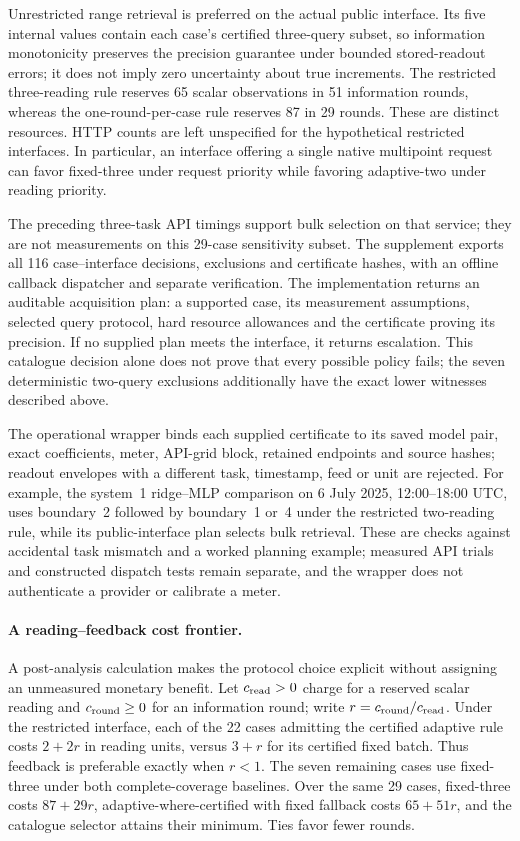 \documentclass[12pt]{article}
\begin{document}
Unrestricted range retrieval is preferred on the actual public interface.
Its five internal values contain each case's certified three-query subset,
so information monotonicity preserves the precision guarantee under bounded
stored-readout errors; it does not imply zero uncertainty about true increments.
The restricted three-reading rule reserves 65 scalar observations in 51
information rounds, whereas the one-round-per-case rule reserves 87 in 29
rounds. These are distinct resources. HTTP counts are left unspecified for
the hypothetical restricted interfaces. In particular, an interface offering
a single native multipoint request can favor fixed-three under request
priority while favoring adaptive-two under reading priority.

The preceding three-task API timings support bulk selection on that service;
they are not measurements on this 29-case sensitivity subset. The supplement exports all
116 case--interface decisions, exclusions and certificate hashes, with an
offline callback dispatcher and separate verification. The implementation returns an auditable acquisition plan: a supported
case, its measurement assumptions, selected query protocol, hard resource
allowances and the certificate proving its precision. If no supplied plan
meets the interface, it returns escalation. This catalogue decision alone
does not prove that every possible policy fails; the seven deterministic
two-query exclusions additionally have the exact lower witnesses described
above.

The operational wrapper binds each supplied certificate to its saved model
pair, exact coefficients, meter, API-grid block, retained endpoints and source
hashes; readout envelopes with a different task, timestamp, feed or unit are
rejected. For example, the system~1 ridge--MLP comparison on 6 July 2025,
12:00--18:00 UTC, uses boundary~2 followed by boundary~1 or~4 under the
restricted two-reading rule, while its public-interface plan selects bulk
retrieval. These are checks against accidental task mismatch and a worked
planning example; measured API trials and constructed dispatch tests remain
separate, and the wrapper does not authenticate a provider or calibrate a meter.
\paragraph{A reading--feedback cost frontier.}
A post-analysis calculation makes the protocol choice explicit without
assigning an unmeasured monetary benefit. Let $c_{\rm read}>0$ charge for a
reserved scalar reading and $c_{\rm round}\geq0$ for an information round;
write $r=c_{\rm round}/c_{\rm read}$. Under the restricted interface, each of
the 22 cases admitting the certified adaptive rule costs $2+2r$ in reading
units, versus $3+r$ for its certified fixed batch. Thus feedback is preferable
exactly when $r<1$. The seven remaining cases use fixed-three under both
complete-coverage baselines. Over the same 29 cases, fixed-three costs
$87+29r$, adaptive-where-certified with fixed fallback costs $65+51r$, and
the catalogue selector attains their minimum. Ties favor fewer rounds.
\end{document}

